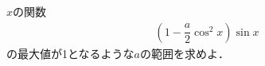 \documentclass[../../main.tex]{subfiles}
\begin{document}
$x$の関数
\begin{align}
  \left( 1-\dfrac{a}{2}\cos^2x \right) \sin x
\end{align}
の最大値が1となるような$a$の範囲を求めよ．
\end{document}
